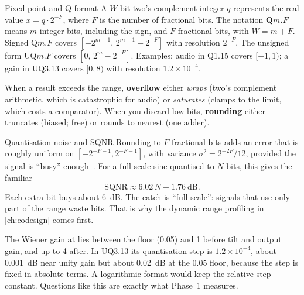 \begin{conceptbox}{Fixed point and Q-format}
A $W$-bit two's-complement integer $q$ represents the real value
$x = q\cdot2^{-F}$, where $F$ is the number of fractional bits. The notation
\textbf{Q$m$.$F$} means $m$ integer bits, including the sign, and $F$
fractional bits, with $W=m+F$. Signed Q$m$.$F$ covers $[-2^{m-1},\,2^{m-1}-2^{-F}]$
with resolution $2^{-F}$. The unsigned form UQ$m$.$F$ covers $[0,\,2^m-2^{-F}]$.
Examples: audio in Q1.15 covers $[-1,1)$; a gain in UQ3.13 covers $[0,8)$ with
resolution $1.2\times10^{-4}$.

When a result exceeds the range, \textbf{overflow} either \emph{wraps} (two's
complement arithmetic, which is catastrophic for audio) or \emph{saturates}
(clamps to the limit, which costs a comparator). When you discard low bits,
\textbf{rounding} either truncates (biased; free) or rounds to nearest (one
adder).
\end{conceptbox}

\begin{conceptbox}{Quantisation noise and SQNR}
Rounding to $F$ fractional bits adds an error that is roughly uniform on
$[-2^{-F-1},2^{-F-1}]$, with variance $\sigma^2=2^{-2F}/12$, provided the signal
is \enquote{busy} enough~\cite{widrow2008quantization}. For a full-scale sine
quantised to $N$ bits, this gives the familiar
\begin{equation}
  \text{SQNR} \approx 6.02\,N + 1.76\ \text{dB}.
  \label{eq:primer:sqnr}
\end{equation}
Each extra bit buys about \qty{6}{\dB}. The catch is \enquote{full-scale}:
signals that use only part of the range waste bits. That is why the dynamic
range profiling in \cref{ch:codesign} comes first.
\end{conceptbox}

\begin{whybox}
The Wiener gain at  lies between the floor (0.05) and 1
before tilt and output gain, and up to 4 after. In UQ3.13 its quantisation step
is $1.2\times10^{-4}$, about \qty{0.001}{\dB} near unity gain but about
\qty{0.02}{\dB} at the 0.05 floor, because the step is fixed in absolute terms.
A logarithmic format would keep the relative step constant. Questions like this
are exactly what Phase~1 measures.
\end{whybox}

